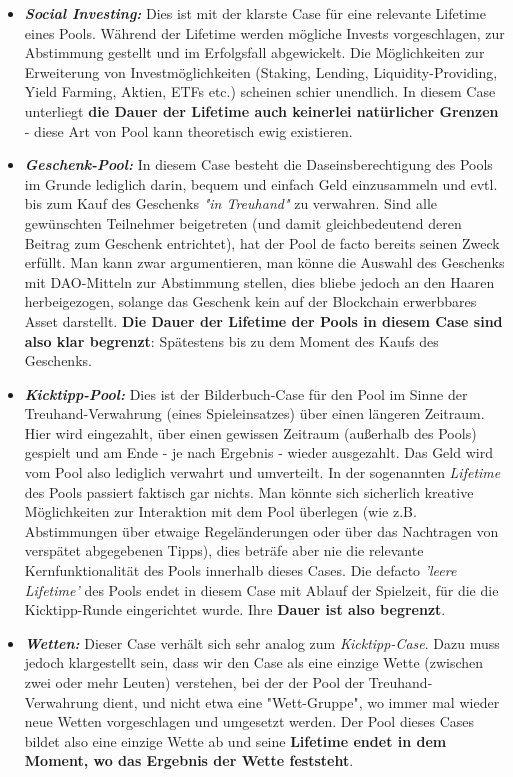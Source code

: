 \begin{itemize}
  \item \textbf{\textit{Social Investing:}} Dies ist mit der klarste Case für eine relevante Lifetime eines Pools. Während der Lifetime werden mögliche Invests vorgeschlagen, zur Abstimmung gestellt und im Erfolgsfall abgewickelt. Die Möglichkeiten zur Erweiterung von Investmöglichkeiten (Staking, Lending, Liquidity-Providing, Yield Farming, Aktien, ETFs etc.) scheinen schier unendlich. In diesem Case unterliegt \textbf{die Dauer der Lifetime auch keinerlei natürlicher Grenzen} - diese Art von Pool kann theoretisch ewig existieren.
  \item \textbf{\textit{Geschenk-Pool:}} In diesem Case besteht die Daseinsberechtigung des Pools im Grunde lediglich darin, bequem und einfach Geld einzusammeln und evtl. bis zum Kauf des Geschenks \textit{"in Treuhand"} zu verwahren. Sind alle gewünschten Teilnehmer beigetreten (und damit gleichbedeutend deren Beitrag zum Geschenk entrichtet), hat der Pool de facto bereits seinen Zweck erfüllt. Man kann zwar argumentieren, man könne die Auswahl des Geschenks mit DAO-Mitteln zur Abstimmung stellen, dies bliebe jedoch an den Haaren herbeigezogen, solange das Geschenk kein auf der Blockchain erwerbbares Asset darstellt. \textbf{Die Dauer der Lifetime der Pools in diesem Case sind also klar begrenzt}: Spätestens bis zu dem Moment des Kaufs des Geschenks.
  \item \textbf{\textit{Kicktipp-Pool:}} Dies ist der Bilderbuch-Case für den Pool im Sinne der Treuhand-Verwahrung (eines Spieleinsatzes) über einen längeren Zeitraum. Hier wird einge\-zahlt, über einen gewissen Zeitraum (außerhalb des Pools) gespielt und am Ende - je nach Ergebnis - wieder ausgezahlt. Das Geld wird vom Pool also lediglich verwahrt und umverteilt. In der sogenannten \textit{Lifetime} des Pools passiert faktisch gar nichts. Man könnte sich sicherlich kreative Möglichkeiten zur Interaktion mit dem Pool überlegen (wie z.B. Abstimmungen über etwaige Regeländerungen oder über das Nachtragen von verspätet abgegebenen Tipps), dies beträfe aber nie die relevante Kernfunktionalität des Pools innerhalb dieses Cases. Die defacto \textit{'leere Lifetime'} des Pools endet in diesem Case mit Ablauf der Spielzeit, für die die Kicktipp-Runde eingerichtet wurde. Ihre \textbf{Dauer ist also begrenzt}.
  \item \textbf{\textit{Wetten:}} Dieser Case verhält sich sehr analog zum \textit{Kicktipp-Case}. Dazu muss jedoch klargestellt sein, dass wir den Case als eine einzige Wette (zwischen zwei oder mehr Leuten) verstehen, bei der der Pool der Treuhand-Verwahrung dient, und nicht etwa eine "Wett-Gruppe", wo immer mal wieder neue Wetten vorgeschlagen und umgesetzt werden. Der Pool dieses Cases bildet also eine einzige Wette ab und seine \textbf{Lifetime endet in dem Moment, wo das Ergebnis der Wette feststeht}.

\end{itemize}
